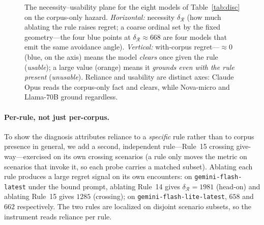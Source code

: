 \documentclass{article}
\newcommand{\regret}{\mathcal{R}}
\begin{document}
\begin{figure}[t]
\centering
{}
\caption{The necessity--usability plane for the eight models of Table~\ref{tab:disc} on the corpus-only
hazard. \emph{Horizontal:} necessity $\delta_{\regret}$ (how much ablating the rule raises regret; a
coarse ordinal set by the fixed geometry---the four blue points at $\delta_{\regret}\!\approx\!668$ are
four models that emit the same avoidance angle). \emph{Vertical:} with-corpus regret---$\approx\!0$
(blue, on the axis) means the model \emph{clears} once given the rule (\emph{usable}); a large value
(orange) means it \emph{grounds even with the rule present} (\emph{unusable}). Reliance and usability are
distinct axes: Claude Opus reads the corpus-only fact and clears, while Nova-micro and Llama-70B ground
regardless.}
\label{fig:plane}
\end{figure}

\paragraph{Per-rule, not just per-corpus.} To show the diagnosis attributes reliance to a
\emph{specific} rule rather than to corpus presence in general, we add a second, independent
rule---Rule~15 crossing give-way---exercised on its own crossing scenarios (a rule only
moves the metric on scenarios that invoke it, so each probe carries a matched subset).
Ablating each rule produces a large regret signal on its own encounters: on
\texttt{gemini-flash-latest} under the bound prompt, ablating Rule~14 gives
$\delta_{\!\regret}{=}1981$ (head-on) and ablating Rule~15 gives $1285$ (crossing); on
\texttt{gemini-flash-lite-latest}, $658$ and $662$ respectively. The two rules are localized
on disjoint scenario subsets, so the instrument reads reliance per rule.
\end{document}

